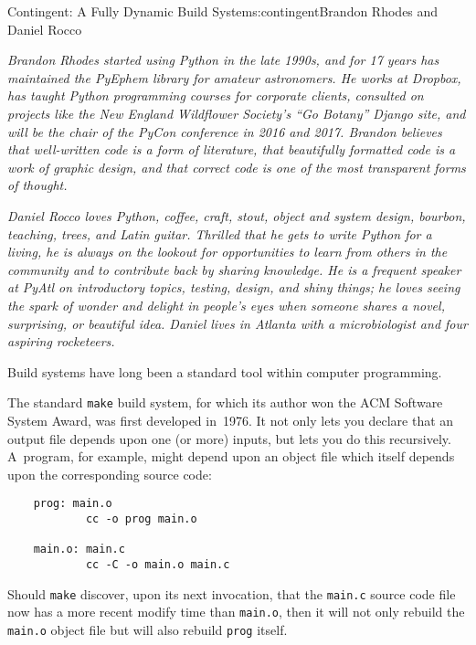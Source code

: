 \begin{aosachapter}{Contingent: A Fully Dynamic Build System}{s:contingent}{Brandon Rhodes and Daniel Rocco}

\emph{Brandon Rhodes started using Python in the late 1990s, and for 17
years has maintained the PyEphem library for amateur astronomers. He
works at Dropbox, has taught Python programming courses for corporate
clients, consulted on projects like the New England Wildflower Society's
``Go Botany'' Django site, and will be the chair of the PyCon conference
in 2016 and 2017. Brandon believes that well-written code is a form of
literature, that beautifully formatted code is a work of graphic design,
and that correct code is one of the most transparent forms of thought.}

\emph{Daniel Rocco loves Python, coffee, craft, stout, object and system
design, bourbon, teaching, trees, and Latin guitar. Thrilled that he
gets to write Python for a living, he is always on the lookout for
opportunities to learn from others in the community and to contribute
back by sharing knowledge. He is a frequent speaker at PyAtl on
introductory topics, testing, design, and shiny things; he loves seeing
the spark of wonder and delight in people's eyes when someone shares a
novel, surprising, or beautiful idea. Daniel lives in Atlanta with a
microbiologist and four aspiring rocketeers.}

\label{introduction}

Build systems have long been a standard tool within computer
programming.

The standard \texttt{make} build system, for which its author won the
ACM Software System Award, was first developed in~1976. It not only lets
you declare that an output file depends upon one (or more) inputs, but
lets you do this recursively. A~program, for example, might depend upon
an object file which itself depends upon the corresponding source code:

\begin{verbatim}
    prog: main.o
            cc -o prog main.o

    main.o: main.c
            cc -C -o main.o main.c
\end{verbatim}

Should \texttt{make} discover, upon its next invocation, that the
\texttt{main.c} source code file now has a more recent modify time than
\texttt{main.o}, then it will not only rebuild the \texttt{main.o}
object file but will also rebuild \texttt{prog} itself.


\end{aosachapter}
